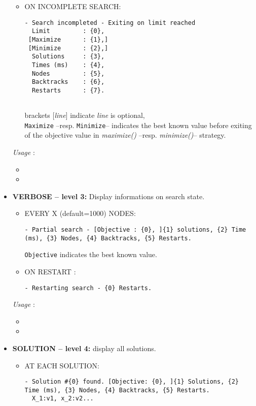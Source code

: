 \begin{itemize}
\begin{itemize}
			\item ON INCOMPLETE SEARCH:
				\begin{lstlisting}
- Search incompleted - Exiting on limit reached
  Limit			: {0},
 [Maximize		: {1},]
 [Minimize		: {2},]
  Solutions		: {3},
  Times (ms)	: {4},
  Nodes			: {5},
  Backtracks	: {6},
  Restarts		: {7}.
  
  \end{lstlisting}
	brackets [\textit{line}] indicate \textit{line} is optional,\\
 	\texttt{Maximize} --resp. \texttt{Minimize}-- indicates the best known value before exiting of the objective value in \textit{maximize()} --resp. \textit{minimize()}-- strategy.
		\end{itemize}			

	\textit{Usage} : 
		\begin{itemize}
		\item {}
		\item {}
		\end{itemize}

	\item \textbf{VERBOSE -- level 3:} Display informations on search state.
		\begin{itemize}
			\item EVERY X (default=1000) NODES:
			\begin{lstlisting}
- Partial search - [Objective : {0}, ]{1} solutions, {2} Time (ms), {3} Nodes, {4} Backtracks, {5} Restarts.
			\end{lstlisting}
			\texttt{Objective} indicates the best known value.

			\item ON RESTART : 
			\begin{lstlisting}
- Restarting search - {0} Restarts.
			\end{lstlisting}
		\end{itemize}
		
		\textit{Usage} : 
		\begin{itemize}
		\item {}
		\item {}
		\end{itemize}

	\item \textbf{SOLUTION -- level 4:} display all solutions.
		\begin{itemize}
			\item AT EACH SOLUTION:
			\begin{lstlisting}
- Solution #{0} found. [Objective: {0}, ]{1} Solutions, {2} Time (ms), {3} Nodes, {4} Backtracks, {5} Restarts.
  X_1:v1, x_2:v2...
			\end{lstlisting}
		\end{itemize}
		

\end{itemize}
